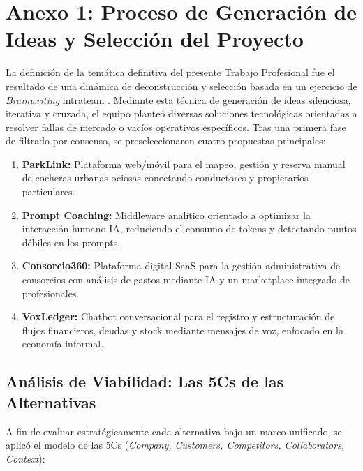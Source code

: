 \newpage
\appendix
\section{Anexo 1: Proceso de Generación de Ideas y Selección del Proyecto}\label{anexo:seleccion}

La definición de la temática definitiva del presente Trabajo Profesional fue el resultado de una dinámica de deconstrucción y selección basada en un ejercicio de \textit{Brainwriting} intrateam \autocite{catedra_brainstorming}. Mediante esta técnica de generación de ideas silenciosa, iterativa y cruzada, el equipo planteó diversas soluciones tecnológicas orientadas a resolver fallas de mercado o vacíos operativos específicos. Tras una primera fase de filtrado por consenso, se preseleccionaron cuatro propuestas principales:

\begin{enumerate}
    \item \textbf{ParkLink:} Plataforma web/móvil para el mapeo, gestión y reserva manual de cocheras urbanas ociosas conectando conductores y propietarios particulares.
    \item \textbf{Prompt Coaching:} Middleware analítico orientado a optimizar la interacción humano-IA, reduciendo el consumo de tokens y detectando puntos débiles en los prompts.
    \item \textbf{Consorcio360:} Plataforma digital SaaS para la gestión administrativa de consorcios con análisis de gastos mediante IA y un marketplace integrado de profesionales.
    \item \textbf{VoxLedger:} Chatbot conversacional para el registro y estructuración de flujos financieros, deudas y stock mediante mensajes de voz, enfocado en la economía informal.
\end{enumerate}

\subsection{Análisis de Viabilidad: Las 5Cs de las Alternativas}
A fin de evaluar estratégicamente cada alternativa bajo un marco unificado, se aplicó el modelo de las 5Cs \autocite{catedra_5cs} (\textit{Company, Customers, Competitors, Collaborators, Context}):

